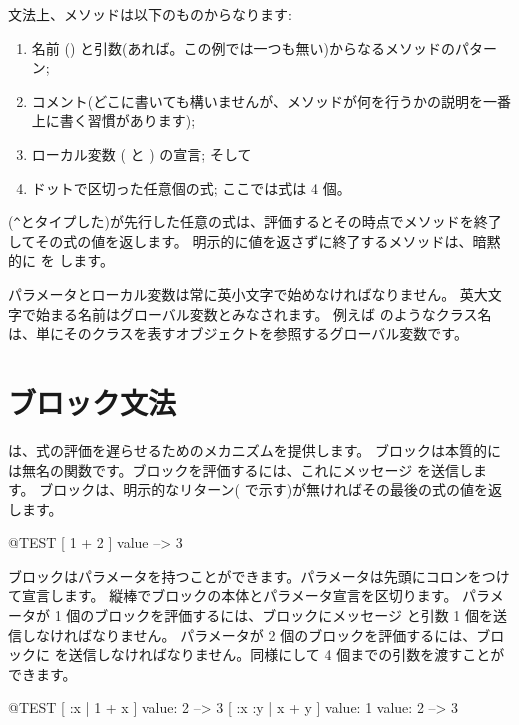 \documentclass[a4paper,10pt,twoside]{book}
\begin{document}
文法上、メソッドは以下のものからなります:
\begin{enumerate}
  \item 名前 (\ie {}) と引数(あれば。この例では一つも無い)からなるメソッドのパターン;
  \item コメント(どこに書いても構いませんが、メソッドが何を行うかの説明を一番上に書く習慣があります);
  \item ローカル変数 (\ie {} と ) の宣言; そして
  \item ドットで区切った任意個の式; ここでは式は 4 個。
\end{enumerate}

\ct{^}(\verb|^|とタイプした)が先行した任意の式は、評価するとその時点でメソッドを終了してその式の値を返します。
明示的に値を返さずに終了するメソッドは、暗黙的に  を します。

パラメータとローカル変数は常に英小文字で始めなければなりません。
英大文字で始まる名前はグローバル変数とみなされます。
例えば  のようなクラス名は、単にそのクラスを表すオブジェクトを参照するグローバル変数です。

\section{ブロック文法}

は、式の評価を遅らせるためのメカニズムを提供します。
ブロックは本質的には無名の関数です。ブロックを評価するには、これにメッセージ  を送信します。
ブロックは、明示的なリターン(\ct{^} で示す)が無ければその最後の式の値を返します。

\begin{code}{@TEST}
[ 1 + 2 ] value --> 3
\end{code}

ブロックはパラメータを持つことができます。パラメータは先頭にコロンをつけて宣言します。
縦棒でブロックの本体とパラメータ宣言を区切ります。
パラメータが 1 個のブロックを評価するには、ブロックにメッセージ  と引数 1 個を送信しなければなりません。
パラメータが 2 個のブロックを評価するには、ブロックに を送信しなければなりません。同様にして 4 個までの引数を渡すことができます。

\begin{code}{@TEST}
[ :x | 1 + x ] value: 2 --> 3
[ :x :y | x + y ] value: 1 value: 2 --> 3
\end{code}
\end{document}
